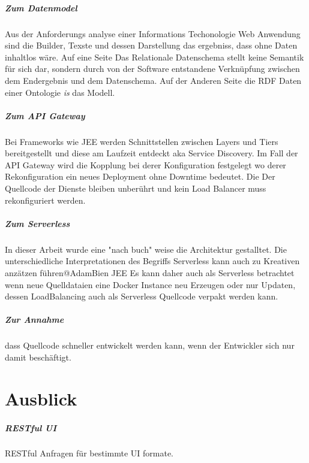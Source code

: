 \documentclass[
12pt,
english,
ngerman,
headsepline,
twoside,
openright,
numbers=noenddot,version=first
]{scrreprt}
\begin{document}
\paragraph{Zum Datenmodel}
Aus der Anforderungs analyse einer Informations Techonologie Web Anwendung sind die Builder, Texste und dessen Darstellung das ergebniss, dass ohne Daten inhaltlos wäre. Auf eine Seite Das Relationale Datenschema stellt keine Semantik für sich dar, sondern durch von der Software entstandene Verknüpfung zwischen dem Endergebnis und dem Datenschema. Auf der Anderen Seite die  RDF Daten einer Ontologie \textit{is} das Modell.

\paragraph{Zum API Gateway}
Bei Frameworks wie JEE werden Schnittstellen zwischen Layers und Tiers bereitgestellt und diese am Laufzeit entdeckt aka Service Discovery. 
Im Fall der API Gateway wird die Kopplung bei derer Konfiguration festgelegt wo derer Rekonfiguration ein neues Deployment ohne Downtime bedeutet. Die Der Quellcode der Dienste bleiben unberührt und kein Load Balancer muss rekonfiguriert werden. 


\paragraph{Zum Serverless}
In dieser Arbeit wurde eine "nach buch" weise die Architektur gestalltet. Die unterschiedliche Interpretationen des Begriffs Serverless kann auch zu Kreativen anzätzen führen@AdamBien JEE
Es kann daher auch als Serverless betrachtet wenn neue Quelldataien eine Docker Instance neu Erzeugen oder nur Updaten, dessen LoadBalancing auch als Serverless Quellcode verpakt werden kann. 

\paragraph{Zur Annahme} dass Quellcode schneller entwickelt werden kann, wenn der Entwickler sich nur damit beschäftigt.

\chapter{Ausblick}



\paragraph{RESTful UI}
RESTful Anfragen für bestimmte UI formate.
\end{document}
